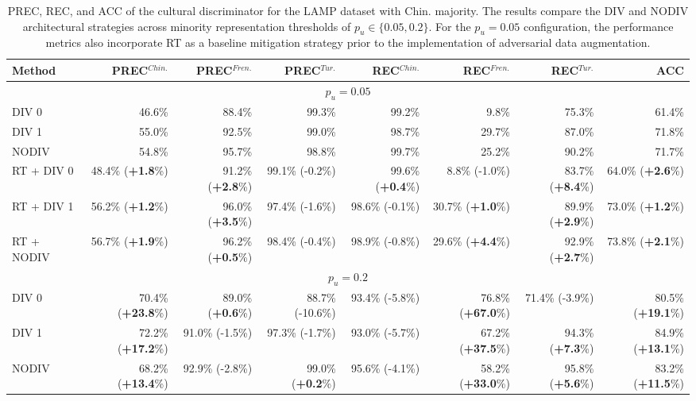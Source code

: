 \begin{table}
\centering
\scriptsize
\setlength{\tabcolsep}{0.1cm}
\begin{tabular}{lrrrrrrr}
\toprule
\textbf{Method} & \textbf{PREC}$^{Chin.}$  & \textbf{PREC}$^{Fren.}$ & \textbf{PREC}$^{Tur.}$ & \textbf{REC}$^{Chin.}$ & \textbf{REC}$^{Fren.}$ & \textbf{REC}$^{Tur.}$ &  \textbf{ACC}\\
\midrule
\multicolumn{8}{c}{$p_u=0.05$} \\
\midrule
DIV 0 & 46.6\%	&	88.4\%&	99.3\%	&	99.2\%&	9.8\%&	75.3\%	&	61.4\%\\	
DIV 1 & 55.0\%	&	92.5\%&	99.0\%&	98.7\%&	29.7\%&	87.0\%	&	71.8\%\\	
NODIV & 54.8\%	&	95.7\%&	98.8\%	&	99.7\%&	25.2\%&	90.2\%	&	71.7\%\\
\midrule
RT + DIV 0      & 48.4\% (\textbf{+1.8}\%) & 91.2\% (\textbf{+2.8}\%) & 99.1\% (-0.2\%) & 99.6\% (\textbf{+0.4}\%) & 8.8\% (-1.0\%) & 83.7\% (\textbf{+8.4}\%) & 64.0\% (\textbf{+2.6}\%) \\
RT + DIV 1      & 56.2\% (\textbf{+1.2}\%) & 96.0\% (\textbf{+3.5}\%) & 97.4\% (-1.6\%) & 98.6\% (-0.1\%) & 30.7\% (\textbf{+1.0}\%) & 89.9\% (\textbf{+2.9}\%) & 73.0\% (\textbf{+1.2}\%) \\
RT + NODIV      & 56.7\% (\textbf{+1.9}\%) & 96.2\% (\textbf{+0.5}\%) & 98.4\% (-0.4\%) & 98.9\% (-0.8\%) & 29.6\% (\textbf{+4.4}\%) & 92.9\% (\textbf{+2.7}\%) & 73.8\% (\textbf{+2.1}\%) \\
\midrule
\multicolumn{8}{c}{$p_u=0.2$} \\
\midrule
DIV 0           & 70.4\% (\textbf{+23.8}\%) & 89.0\% (\textbf{+0.6}\%) & 88.7\% (-10.6\%) & 93.4\% (-5.8\%) & 76.8\% (\textbf{+67.0}\%) & 71.4\% (-3.9\%) & 80.5\% (\textbf{+19.1}\%) \\
DIV 1           & 72.2\% (\textbf{+17.2}\%) & 91.0\% (-1.5\%) & 97.3\% (-1.7\%) & 93.0\% (-5.7\%) & 67.2\% (\textbf{+37.5}\%) & 94.3\% (\textbf{+7.3}\%) & 84.9\% (\textbf{+13.1}\%) \\
NODIV           & 68.2\% (\textbf{+13.4}\%) & 92.9\% (-2.8\%) & 99.0\% (\textbf{+0.2}\%) & 95.6\% (-4.1\%) & 58.2\% (\textbf{+33.0}\%) & 95.8\% (\textbf{+5.6}\%) & 83.2\% (\textbf{+11.5}\%) \\
\bottomrule
\end{tabular}
\caption{PREC, REC, and ACC of the cultural discriminator for the LAMP dataset with Chin. majority. The results compare the DIV and NODIV architectural strategies across minority representation thresholds of $p_u \in \{0.05, 0.2\}$. For the $p_u = 0.05$ configuration, the performance metrics also incorporate RT as a baseline mitigation strategy prior to the implementation of adversarial data augmentation.}
\label{ch3:tab:discr:LC}
\end{table}
